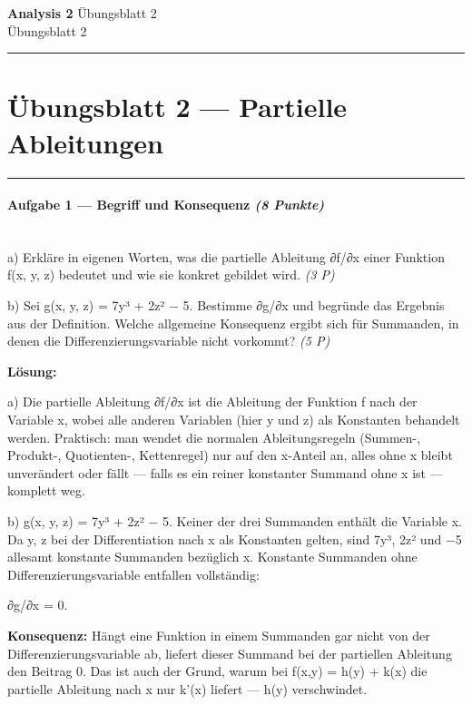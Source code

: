 \documentclass[11pt, a4paper]{article}
\providecommand{\nichttitle}{Übungsblatt}
\providecommand{\nichtsubtitle}{}
\renewcommand{\nichttitle}{Analysis 2}
\renewcommand{\nichtsubtitle}{Übungsblatt 2}
\begin{document}
\begin{center}
{\Large\bfseries\color{accent}\nichttitle}
\ifx\nichtsubtitle\empty\else
  \\[2pt]{\normalsize\color{accent!80!black}\nichtsubtitle}
\fi
\\[2pt]
\color{accent}\rule{0.4\linewidth}{0.8pt}\color{black}
\end{center}
\vspace{4pt}


\section{Übungsblatt 2 — Partielle Ableitungen}


\noindent\textcolor{rulegray}{\rule{\linewidth}{0.4pt}}


\paragraph{Aufgabe 1 — Begriff und Konsequenz \textit{(8 Punkte)}}\mbox{}\\[2pt]

a) Erkläre in eigenen Worten, was die partielle Ableitung ∂f/∂x einer Funktion f(x, y, z) bedeutet und wie sie konkret gebildet wird. \textit{(3 P)}


b) Sei g(x, y, z) = 7y³ + 2z² − 5. Bestimme ∂g/∂x und begründe das Ergebnis aus der Definition. Welche allgemeine Konsequenz ergibt sich für Summanden, in denen die Differenzierungsvariable nicht vorkommt? \textit{(5 P)}


\textbf{Lösung:}


a) Die partielle Ableitung ∂f/∂x ist die Ableitung der Funktion f nach der Variable x, wobei alle anderen Variablen (hier y und z) als Konstanten behandelt werden. Praktisch: man wendet die normalen Ableitungsregeln (Summen-, Produkt-, Quotienten-, Kettenregel) nur auf den x-Anteil an, alles ohne x bleibt unverändert oder fällt — falls es ein reiner konstanter Summand ohne x ist — komplett weg.


b) g(x, y, z) = 7y³ + 2z² − 5. Keiner der drei Summanden enthält die Variable x. Da y, z bei der Differentiation nach x als Konstanten gelten, sind 7y³, 2z² und −5 allesamt konstante Summanden bezüglich x. Konstante Summanden ohne Differenzierungsvariable entfallen vollständig:


∂g/∂x = 0.


\textbf{Konsequenz:} Hängt eine Funktion in einem Summanden gar nicht von der Differenzierungsvariable ab, liefert dieser Summand bei der partiellen Ableitung den Beitrag 0. Das ist auch der Grund, warum bei f(x,y) = h(y) + k(x) die partielle Ableitung nach x nur k'(x) liefert — h(y) verschwindet.
\end{document}
